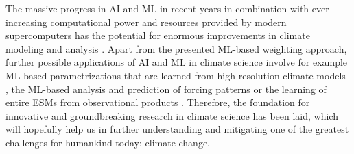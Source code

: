 The massive progress in \ac{AI} and \ac{ML} in recent years in combination with
ever increasing computational power and resources provided by modern
supercomputers has the potential for enormous improvements in climate modeling
and analysis \autocite{Reichstein2019}. Apart from the presented \ac{ML}-based
weighting approach, further possible applications of \ac{AI} and \ac{ML} in
climate science involve for example \ac{ML}-based parametrizations that are
learned from high-resolution climate models \autocite{Rasp2018}, the
\ac{ML}-based analysis and prediction of forcing patterns \autocite{Barnes2019,
  Mansfield2020} or the learning of entire \acp{ESM} from observational
products \autocite{Geer2021}. Therefore, the foundation for innovative and
groundbreaking research in climate science has been laid, which will hopefully
help us in further understanding and mitigating one of the greatest challenges
for humankind today: climate change.
